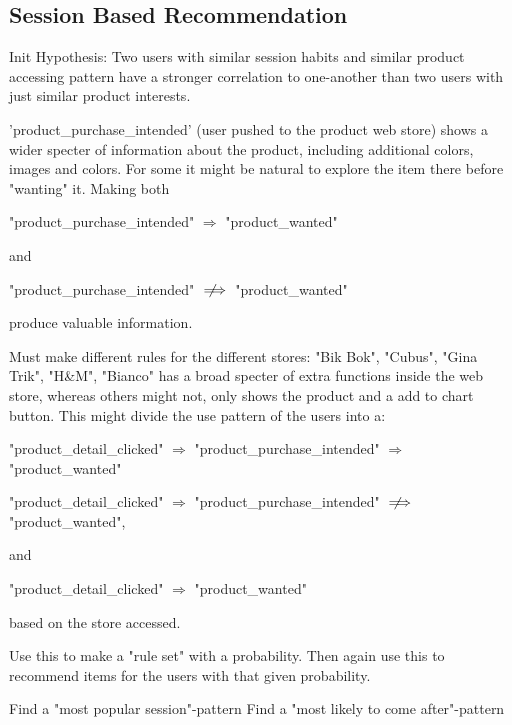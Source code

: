 


\subsection{Session Based Recommendation}
Init Hypothesis:
Two users with similar session habits and similar product accessing pattern
have a stronger correlation to one-another than two users with just similar
product interests.


'product\_purchase\_intended' (user pushed to the product web store) shows a
wider specter of information about the product, including additional colors,
images and colors.  For some it might be natural to explore the item there
before "wanting" it. Making both

"product\_purchase\_intended" $\Rightarrow$ "product\_wanted"

and

"product\_purchase\_intended" $\notimplies$ "product\_wanted"

produce valuable information.

Must make different rules for the different stores:
"Bik Bok", "Cubus", "Gina Trik", "H\&M", "Bianco" has a broad specter of extra
functions inside the web store, whereas others might not, only shows the
product and a add to chart button.  This might divide the use pattern of the
users into a:

"product\_detail\_clicked" $\Rightarrow$ "product\_purchase\_intended" $\Rightarrow$ "product\_wanted"

"product\_detail\_clicked" $\Rightarrow$ "product\_purchase\_intended" $\notimplies$ "product\_wanted",

and

"product\_detail\_clicked" $\Rightarrow$ "product\_wanted"

based on the store accessed.

Use this to make a "rule set" with a probability.
Then again use this to recommend items for the users with that given
probability.

Find a "most popular session"-pattern
Find a "most likely to come after"-pattern

